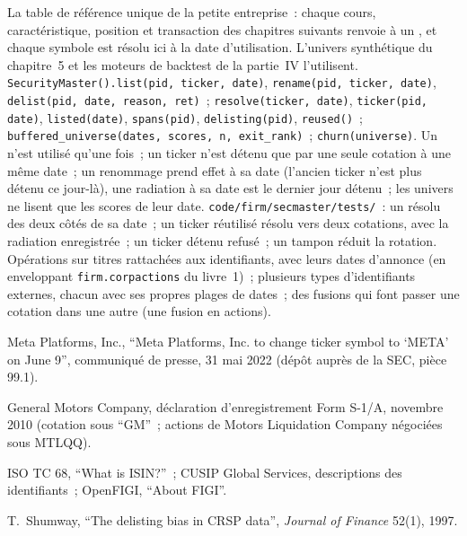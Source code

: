 \begin{build}
 La table de référence unique de la petite entreprise~: chaque cours, caractéristique, position et transaction des chapitres suivants renvoie à un
, et chaque symbole est résolu ici à la date d'utilisation. L'univers synthétique du chapitre~5 et
les moteurs de backtest de la partie~IV l'utilisent.
 \texttt{SecurityMaster().list(pid, ticker, date)}, \texttt{rename(pid, ticker, date)},
\texttt{delist(pid, date, reason, ret)}~; \texttt{resolve(ticker, date)}, \texttt{ticker(pid, date)}, \texttt{listed(date)}, \texttt{spans(pid)},
\texttt{delisting(pid)}, \texttt{reused()}~; \texttt{buffered\_universe(dates, scores, n, exit\_rank)}~; \texttt{churn(universe)}.
 Un  n'est utilisé qu'une fois~; un ticker n'est détenu que par une seule cotation à une même date~; un renommage prend effet à sa
date (l'ancien ticker n'est plus détenu ce jour-là), une radiation à sa date est le dernier jour détenu~; les univers ne lisent que les scores de leur
date.
 \texttt{code/firm/secmaster/tests/}~: un  résolu des deux côtés de sa date~; un ticker réutilisé
résolu vers deux cotations, avec la radiation enregistrée~; un ticker détenu refusé~; un tampon réduit la rotation.
 Opérations sur titres rattachées aux identifiants, avec leurs dates d'annonce (en enveloppant \texttt{firm.corpactions} du livre~1)~;
plusieurs types d'identifiants externes, chacun avec ses propres plages de dates~; des fusions qui font passer une cotation dans une autre (une fusion en actions).
\end{build}

\begin{omsources}
\item Meta Platforms, Inc., ``Meta Platforms, Inc. to change ticker symbol to `META' on June 9'', communiqué de presse, 31 mai 2022 (dépôt auprès de la SEC,
pièce 99.1).
\item General Motors Company, déclaration d'enregistrement Form S-1/A, novembre 2010 (cotation sous ``GM''~; actions de
Motors Liquidation Company négociées sous MTLQQ).
\item ISO TC 68, ``What is ISIN?''~; CUSIP Global Services, descriptions des identifiants~; OpenFIGI, ``About FIGI''.
\item T.~Shumway, ``The delisting bias in CRSP data'', \emph{Journal of Finance} 52(1), 1997.
\end{omsources}

